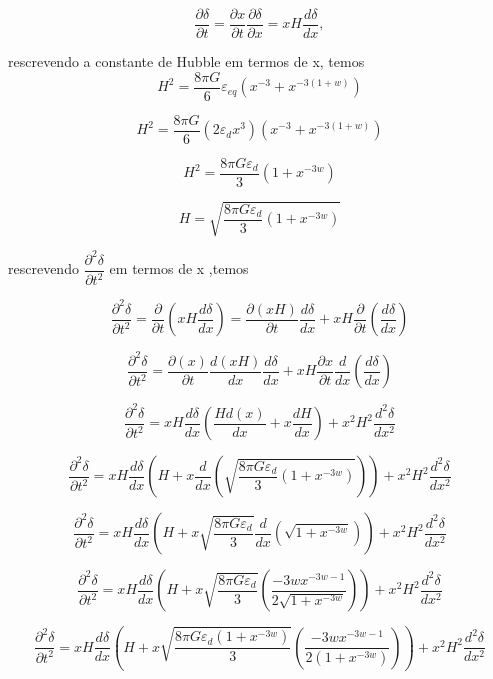 \documentclass[a4paper,12pt]{article}
\begin{document}
$$\dfrac{\partial \delta}{\partial t } = \dfrac{\partial x}{\partial t } \dfrac{\partial \delta}{\partial x }= xH \dfrac{d \delta}{d x },$$

rescrevendo a constante de Hubble em termos de x, temos
$$H^2 = \dfrac{8\pi G}{6}\varepsilon_{eq}\left( x^{-3} +x^{-3 (1+w)}\right)$$

$$H^2 = \dfrac{8\pi G}{6}\left( 2\varepsilon_{d}x^3\right)\left( x^{-3} +x^{-3 (1+w)}\right)$$

$$H^2 = \dfrac{8\pi G\varepsilon_{d}}{3}\left( 1 +x^{-3w}\right)$$

$$H = \sqrt{\dfrac{8\pi G\varepsilon_{d}}{3}\left( 1 +x^{-3w}\right)}$$

rescrevendo $\dfrac{\partial^2 \delta}{\partial t^2}$ em termos de x ,temos

$$\dfrac{\partial^2 \delta}{\partial t^2} = \dfrac{\partial }{\partial t }\left(xH \dfrac{d \delta}{d x } \right)= \dfrac{\partial (xH) }{\partial t }\dfrac{d \delta}{d x } + xH\dfrac{\partial }{\partial t }\left( \dfrac{d \delta}{d x } \right)$$

$$\dfrac{\partial^2 \delta}{\partial t^2} =\dfrac{\partial (x) }{\partial t }\dfrac{d(xH) }{dx }\dfrac{d \delta}{d x } + xH\dfrac{\partial x}{\partial t }\dfrac{d}{dx }\left( \dfrac{d \delta}{d x } \right)$$

$$\dfrac{\partial^2 \delta}{\partial t^2} = xH\dfrac{d \delta}{d x }\left( \dfrac{Hd(x) }{dx } + x\dfrac{dH }{dx }\right) + x^2H^2 \dfrac{d^2 \delta}{d x^2 }$$

$$\dfrac{\partial^2 \delta}{\partial t^2} = xH\dfrac{d \delta}{d x }\left( H + x\dfrac{d }{dx }\left( \sqrt{\dfrac{8\pi G\varepsilon_{d}}{3}\left( 1 +x^{-3w}\right)}\right)\right) + x^2H^2 \dfrac{d^2 \delta}{d x^2 }$$

$$\dfrac{\partial^2 \delta}{\partial t^2} = xH\dfrac{d \delta}{d x }\left( H + x\sqrt{\dfrac{8\pi G\varepsilon_{d}}{3}}\dfrac{d }{dx }\left(\sqrt{  1 +x^{-3w}} \right)\right) + x^2H^2 \dfrac{d^2 \delta}{d x^2 }$$

$$\dfrac{\partial^2 \delta}{\partial t^2} = xH\dfrac{d \delta}{d x }\left( H + x\sqrt{\dfrac{8\pi G\varepsilon_{d}}{3}} \left(\dfrac{-3wx^{-3w -1}}{2\sqrt{1 +x^{-3w}}} \right)\right) + x^2H^2 \dfrac{d^2 \delta}{d x^2 }$$

$$\dfrac{\partial^2 \delta}{\partial t^2} = xH\dfrac{d \delta}{d x }\left( H + x\sqrt{\dfrac{8\pi G\varepsilon_{d}(1 +x^{-3w})}{3}} \left(\dfrac{-3wx^{-3w -1}}{2(1 +x^{-3w})} \right)\right) + x^2H^2 \dfrac{d^2 \delta}{d x^2 }$$
\end{document}

